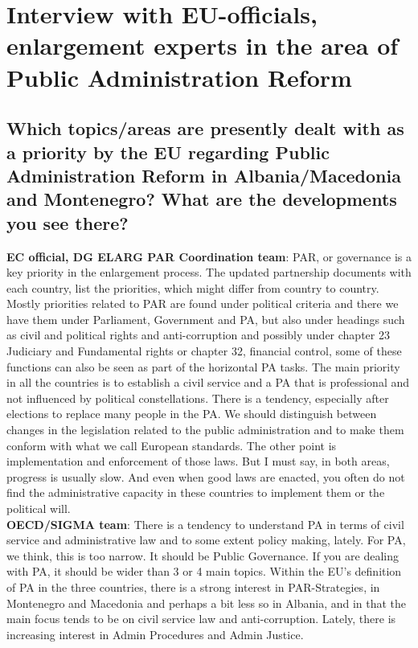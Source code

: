 
\chapter{Interview with EU-officials, enlargement experts in the area of Public Administration Reform}
\label{anhang:InterviewEuOfficials}
\section{Which topics/areas are presently dealt with as a priority by the EU regarding Public Administration Reform in Albania/Macedonia and Montenegro? What are the developments you see there? }
\label{sec:there}
\textbf{EC official, DG ELARG PAR Coordination team}: PAR, or governance is a key priority in the enlargement process. The updated partnership documents with each country, list the priorities, which might differ from country to country. Mostly priorities related to PAR are found under political criteria and there we have them under Parliament, Government and PA, but also under headings such as civil and political rights and anti-corruption and possibly under chapter 23 Judiciary and Fundamental rights or chapter 32, financial control, some of these functions can also be seen as part of the horizontal PA tasks. The main priority in all the countries is to establish a civil service and a PA that is professional and not influenced by political constellations. There is a tendency, especially after elections to replace many people in the PA. We should distinguish between changes in the legislation related to the public administration and to make them conform with what we call European standards. The other point is implementation and enforcement of those laws. But I must say, in both areas, progress is usually slow. And even when good laws are enacted, you often do not find the administrative capacity in these countries to implement them or the political will. \\
\textbf{OECD/SIGMA team}: There is a tendency to understand PA in terms of civil service and administrative law and to some extent policy making, lately. For PA, we think, this is too narrow. It should be Public Governance. If you are dealing with PA, it should be wider than 3 or 4 main topics. Within the EU's definition of PA in the three countries, there is a strong interest in PAR-Strategies, in Montenegro and Macedonia and perhaps a bit less so in Albania, and in that the main focus tends to be on civil service law and anti-corruption. Lately, there is increasing interest in Admin Procedures and Admin Justice.\\

